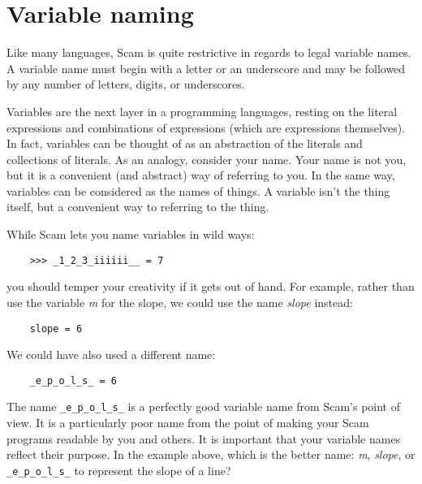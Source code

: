 \section{Variable naming}

Like many languages,
Scam is quite restrictive in regards to legal variable names.
A variable name must begin with a letter or an underscore
and may be followed by any number of letters, digits, or
underscores.

Variables are the next layer in a programming languages,
resting on
the literal expressions and combinations of expressions (which are
expressions themselves).
In fact,
variables can be thought of as an
abstraction of the literals and collections of literals.
As an analogy,
consider your name.
Your
name is not you,
but it is a convenient (and abstract) way of referring
to you.
In the same way,
variables can be considered as the names of
things.
A variable isn't the thing itself,
but a convenient way to referring
to the thing.

While Scam lets you name variables in wild ways:

\begin{verbatim}
    >>> _1_2_3_iiiiii__ = 7
\end{verbatim}

you should temper your
creativity if it gets out of hand.
For example,
rather than use the
variable {\it m} for the slope,
we could use the name {\it slope} instead:

\begin{verbatim}
    slope = 6
\end{verbatim}

We could have also used a different name:

\begin{verbatim}
    _e_p_o_l_s_ = 6
\end{verbatim}

The name {\tt \_e\_p\_o\_l\_s\_}
is a perfectly good variable name from Scam's point of
view.
It is a particularly poor name from the point of making your Scam
programs readable by you and others.
It is important that your variable
names reflect their purpose.
In the example above,
which is the better name: {\it m}, {\it slope}, or 
{\tt \_e\_p\_o\_l\_s\_}
to represent the slope of a line?
